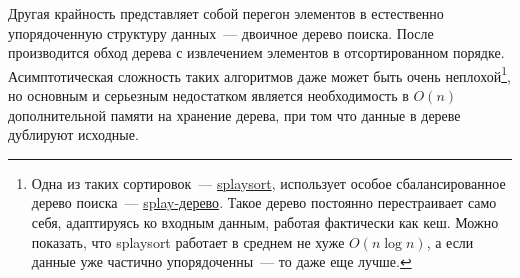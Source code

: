 Другая крайность представляет собой перегон элементов в естественно упорядоченную структуру данных~--- двоичное дерево поиска.
После производится обход дерева с извлечением элементов в отсортированном порядке.
Асимптотическая сложность таких алгоритмов даже может быть очень неплохой\footnote{
  Одна из таких сортировок~--- \href{https://en.wikipedia.org/wiki/Splaysort}{splaysort}, использует особое
  сбалансированное дерево поиска~--- \href{https://en.wikipedia.org/wiki/Splay_tree}{splay-дерево}. Такое дерево постоянно перестраивает
  само себя, адаптируясь ко входным данным, работая фактически как кеш. Можно показать, что splaysort работает в среднем не хуже
  \(O(n\log{n})\), а если данные уже частично упорядоченны~--- то даже еще лучше.
}, но основным и серьезным недостатком является
необходимость в \(O(n)\) дополнительной памяти на хранение дерева, при том что данные в дереве дублируют исходные.


